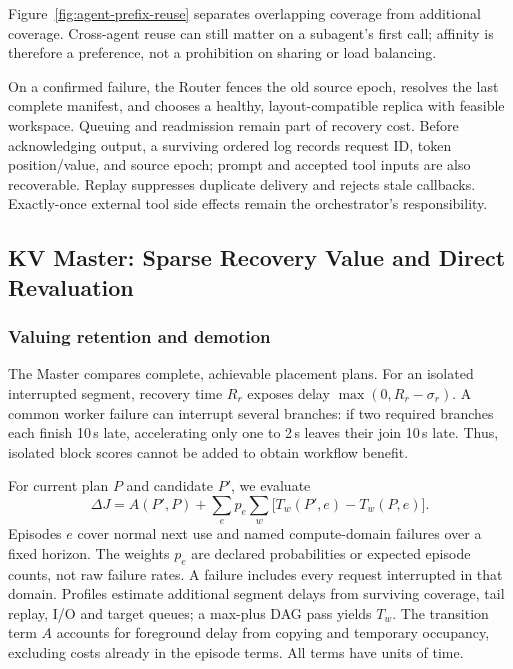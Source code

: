 Figure~\ref{fig:agent-prefix-reuse} separates overlapping coverage from
additional coverage. Cross-agent reuse can still matter on a subagent's
first call; affinity is therefore a preference, not a prohibition on
sharing or load balancing.

On a confirmed failure, the Router fences the old source epoch, resolves
the last complete manifest, and chooses a healthy, layout-compatible
replica with feasible workspace. Queuing and readmission remain part of
recovery cost. Before acknowledging output, a surviving ordered log
records request ID, token position/value, and source epoch; prompt and
accepted tool inputs are also recoverable. Replay suppresses duplicate
delivery and rejects stale callbacks. Exactly-once external tool side
effects remain the orchestrator's responsibility.

\subsection{KV Master: Sparse Recovery Value and Direct Revaluation}
\label{sec:kv-master}

\subsubsection{Valuing retention and demotion}
\label{sec:placement-value}

The Master compares complete, achievable placement plans. For an isolated
interrupted segment, recovery time $R_r$ exposes delay
$\max(0,R_r-\sigma_r)$. A common worker failure can interrupt several
branches: if two required branches each finish 10\,s late, accelerating
only one to 2\,s leaves their join 10\,s late. Thus, isolated block scores
cannot be added to obtain workflow benefit.

For current plan $P$ and candidate $P'$, we evaluate
\begin{equation}
 \Delta J=A(P',P)+\sum_e p_e\sum_w
       \bigl[T_w(P',e)-T_w(P,e)\bigr].
 \label{eq:value}
\end{equation}
Episodes $e$ cover normal next use and named compute-domain failures over
a fixed horizon. The weights $p_e$ are declared probabilities or expected
episode counts, not raw failure rates. A failure includes every request
interrupted in that domain. Profiles estimate additional segment delays
from surviving coverage, tail replay, I/O and target queues; a max-plus
DAG pass yields $T_w$. The transition term $A$ accounts for foreground
delay from copying and temporary occupancy, excluding costs already in
the episode terms. All terms have units of time.


